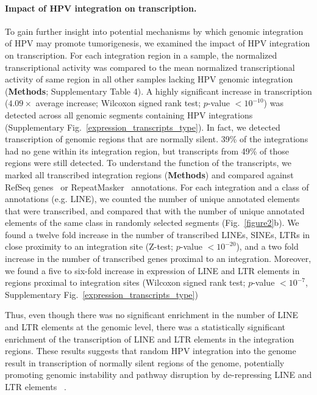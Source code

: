 \documentclass{bmcart}
\begin{document}
\paragraph{\textbf{Impact of HPV integration on transcription.}} To gain further insight into 
potential mechanisms by which genomic integration of HPV may promote tumorigenesis, we examined the impact
of HPV integration on transcription.  For each integration region in a
sample, the normalized transcriptional activity was compared to the
mean normalized transcriptional activity of same region in all other
samples lacking HPV genomic integration (\textbf{Methods}; Supplementary Table 4). A highly
significant increase in transcription ($4.09\times$ average increase;
Wilcoxon signed rank test; $p$-value $<10^{-10}$) was detected across
all genomic segments containing HPV integrations
(Supplementary Fig.~\ref{expression_transcripts_type}).  In fact, we detected
transcription of genomic regions that are normally silent.  39\% of
the integrations had no gene within its integration region, but
transcripts from 49\% of those regions were still detected. To
understand the function of the transcripts, we marked all transcribed
integration regions (\textbf{Methods}) and compared against RefSeq
genes~\cite{OLeary2016} or RepeatMasker~\cite{Tarailo-Graovac2009}
annotations. For each integration and a class of annotations
(e.g. LINE), we counted the number of unique annotated elements that
were transcribed, and compared that with the number of unique
annotated elements of the same class in randomly selected segments
(Fig.~\ref{figure2}b). We found a twelve fold increase in the number
of transcribed LINEs, SINEs, LTRs in close proximity to an integration
site (Z-test; $p$-value $<10^{-20}$), and a two fold increase in the
number of transcribed genes proximal to an integration.  Moreover, we
found a five to six-fold increase in expression of LINE and LTR
elements in regions proximal to integration sites (Wilcoxon signed
rank test; $p$-value $<10^{-7}$, Supplementary Fig.~\ref{expression_transcripts_type})

Thus, even though there was no significant enrichment in the number of
LINE and LTR elements at the genomic level, there was a statistically
significant enrichment of the transcription of LINE and LTR elements
in the integration regions.  These results suggests that random HPV
integration into the genome result in transcription of normally silent
regions of the genome, potentially promoting genomic instability and
pathway disruption by de-repressing LINE and LTR elements
~\cite{Gasior2006,Kinomoto2007,Romanish2010,Sigurdsson2012,Yu2013,
  Rodic2013,Xiao-Jie2016}.
\end{document}
